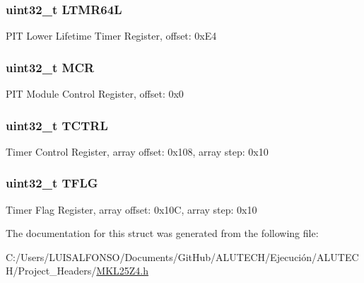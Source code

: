 \subsubsection[{L\+T\+M\+R64\+L}]{\setlength{\rightskip}{0pt plus 5cm}uint32\+\_\+t L\+T\+M\+R64\+L}\label{struct_p_i_t___mem_map_ab3f43f5df1b7776759e6497948c4e17f}
P\+I\+T Lower Lifetime Timer Register, offset\+: 0x\+E4 \hypertarget{struct_p_i_t___mem_map_ab603c8e2ca1916ef6262af4b6a969e17}{}
\subsubsection[{M\+C\+R}]{\setlength{\rightskip}{0pt plus 5cm}uint32\+\_\+t M\+C\+R}\label{struct_p_i_t___mem_map_ab603c8e2ca1916ef6262af4b6a969e17}
P\+I\+T Module Control Register, offset\+: 0x0 \hypertarget{struct_p_i_t___mem_map_a08ca8a896322049f4b82825f4b0ba6ee}{}
\subsubsection[{T\+C\+T\+R\+L}]{\setlength{\rightskip}{0pt plus 5cm}uint32\+\_\+t T\+C\+T\+R\+L}\label{struct_p_i_t___mem_map_a08ca8a896322049f4b82825f4b0ba6ee}
Timer Control Register, array offset\+: 0x108, array step\+: 0x10 \hypertarget{struct_p_i_t___mem_map_a99ca085350eab8581351ff32448cde09}{}
\subsubsection[{T\+F\+L\+G}]{\setlength{\rightskip}{0pt plus 5cm}uint32\+\_\+t T\+F\+L\+G}\label{struct_p_i_t___mem_map_a99ca085350eab8581351ff32448cde09}
Timer Flag Register, array offset\+: 0x10\+C, array step\+: 0x10 

The documentation for this struct was generated from the following file\+:\begin{DoxyCompactItemize}
\item 
C\+:/\+Users/\+L\+U\+I\+S\+A\+L\+F\+O\+N\+S\+O/\+Documents/\+Git\+Hub/\+A\+L\+U\+T\+E\+C\+H/\+Ejecución/\+A\+L\+U\+T\+E\+C\+H/\+Project\+\_\+\+Headers/\hyperlink{_m_k_l25_z4_8h}{M\+K\+L25\+Z4.\+h}\end{DoxyCompactItemize}
